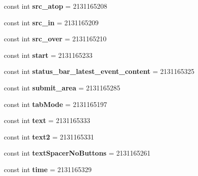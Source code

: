 \begin{DoxyCompactItemize}
const int {\bfseries src\+\_\+atop} = 2131165208
\item 
\mbox{\label{classXaria_1_1Resource_1_1Id_ae5eec3dfcd9abb5fce6016c25539c1ea}} 
const int {\bfseries src\+\_\+in} = 2131165209
\item 
\mbox{\label{classXaria_1_1Resource_1_1Id_a8e202223772a029acd5c7622eca6aeef}} 
const int {\bfseries src\+\_\+over} = 2131165210
\item 
\mbox{\label{classXaria_1_1Resource_1_1Id_a88b06e4a84b88d798df2ca40e5f37482}} 
const int {\bfseries start} = 2131165233
\item 
\mbox{\label{classXaria_1_1Resource_1_1Id_a6a5f67747fcfee845ca5e54f1237096a}} 
const int {\bfseries status\+\_\+bar\+\_\+latest\+\_\+event\+\_\+content} = 2131165325
\item 
\mbox{\label{classXaria_1_1Resource_1_1Id_a54f98fc43aafbaa66081110bad55d215}} 
const int {\bfseries submit\+\_\+area} = 2131165285
\item 
\mbox{\label{classXaria_1_1Resource_1_1Id_a8c33f0ca9f0bd597bb22ea580c6f5c93}} 
const int {\bfseries tab\+Mode} = 2131165197
\item 
\mbox{\label{classXaria_1_1Resource_1_1Id_af51c60ae3a6f8ba4ff9a8749005ec831}} 
const int {\bfseries text} = 2131165333
\item 
\mbox{\label{classXaria_1_1Resource_1_1Id_aeb858fd8f21c46fcddd2c20167f425e4}} 
const int {\bfseries text2} = 2131165331
\item 
\mbox{\label{classXaria_1_1Resource_1_1Id_a3559ce22b3b08c9e30fe86696ba260c2}} 
const int {\bfseries text\+Spacer\+No\+Buttons} = 2131165261
\item 
\mbox{\label{classXaria_1_1Resource_1_1Id_a3943fd895fe57a22d22e30f35064628a}} 
const int {\bfseries time} = 2131165329
\item 

\end{DoxyCompactItemize}
